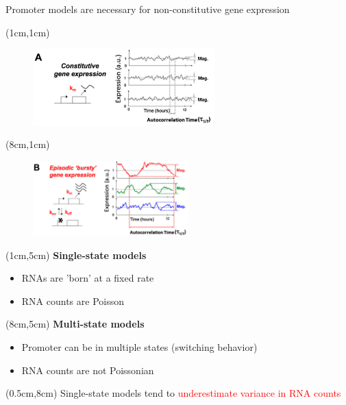 \documentclass[aspectratio=1610]{beamer}					%
\begin{document}
\begin{frame}{Promoter models are necessary for non-constitutive gene expression}


\begin{textblock*}{7cm}(1cm,1cm)
\begin{figure}
\includegraphics[width=7cm]{burst-1.png}
\end{figure}
\end{textblock*}

\begin{textblock*}{7cm}(8cm,1cm)
\begin{figure}
\includegraphics[width=6cm]{burst-2.png}
\end{figure}
\end{textblock*}


\begin{textblock*}{6cm}(1cm,5cm)
\hspace{0.5in}\textbf{Single-state models}
\begin{itemize}
\item RNAs are 'born' at a fixed rate
\item RNA counts are Poisson
\end{itemize}
\end{textblock*}

\begin{textblock*}{6cm}(8cm,5cm)
\hspace{0.5in}\textbf{Multi-state models}
\begin{itemize}
\item Promoter can be in multiple states (switching behavior)
\item RNA counts are not Poissonian
\end{itemize}

\end{textblock*}

\begin{textblock*}{15cm}(0.5cm,8cm)
Single-state models tend to \textcolor{red}{underestimate variance in RNA counts}
\end{textblock*}


\end{frame}
\end{document}
